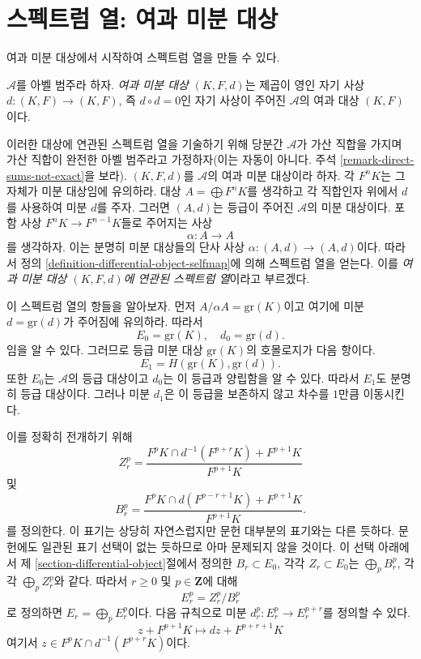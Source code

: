 \section{스펙트럼 열: 여과 미분 대상}
\label{section-filtered-differential}

\noindent
여과 미분 대상에서 시작하여 스펙트럼 열을 만들 수 있다.

\begin{definition}
\label{definition-filtered-differential}
$\mathcal{A}$를 아벨 범주라 하자. {\it 여과 미분 대상}
$(K, F, d)$는 제곱이 영인 자기 사상
$d : (K, F) \to (K, F)$, 즉 $d \circ d = 0$인 자기 사상이 주어진
$\mathcal{A}$의 여과 대상 $(K, F)$이다.
\end{definition}

\noindent
이러한 대상에 연관된 스펙트럼 열을 기술하기 위해 당분간
$\mathcal{A}$가 가산 직합을 가지며 가산 직합이 완전한 아벨 범주라고
가정하자(이는 자동이 아니다. 주석 \ref{remark-direct-sums-not-exact}을
보라). $(K, F, d)$를 $\mathcal{A}$의 여과 미분 대상이라 하자.
각 $F^nK$는 그 자체가 미분 대상임에 유의하라. 대상
$A = \bigoplus F^nK$를 생각하고 각 직합인자 위에서 $d$를 사용하여
미분 $d$를 주자. 그러면 $(A, d)$는 등급이 주어진 $\mathcal{A}$의
미분 대상이다. 포함 사상 $F^nK \to F^{n - 1}K$들로 주어지는 사상
$$
\alpha : A \to A
$$
를 생각하자. 이는 분명히 미분 대상들의 단사 사상
$\alpha : (A, d) \to (A, d)$이다. 따라서 정의
\ref{definition-differential-object-selfmap}에 의해 스펙트럼 열을 얻는다.
이를 {\it 여과 미분 대상 $(K, F, d)$에 연관된 스펙트럼 열}이라고
부르겠다.

\medskip\noindent
이 스펙트럼 열의 항들을 알아보자. 먼저
$A/\alpha A = \text{gr}(K)$이고 여기에 미분
$d = \text{gr}(d)$가 주어짐에 유의하라. 따라서
$$
E_0 = \text{gr}(K), \quad d_0 = \text{gr}(d).
$$
임을 알 수 있다. 그러므로 등급 미분 대상 $\text{gr}(K)$의 호몰로지가
다음 항이다.
$$
E_1 = H(\text{gr}(K), \text{gr}(d)).
$$
또한 $E_0$는 $\mathcal{A}$의 등급 대상이고 $d_0$는 이 등급과
양립함을 알 수 있다. 따라서 $E_1$도 분명히 등급 대상이다. 그러나
미분 $d_1$은 이 등급을 보존하지 않고 차수를 $1$만큼 이동시킨다.

\medskip\noindent
이를 정확히 전개하기 위해
$$
Z_r^p =
\frac{F^pK \cap d^{-1}(F^{p + r}K) + F^{p + 1}K}{F^{p + 1}K}
$$
및
$$
B_r^p =
\frac{F^pK \cap d(F^{p - r + 1}K) + F^{p + 1}K}{F^{p + 1}K}.
$$
를 정의한다. 이 표기는 상당히 자연스럽지만 문헌 대부분의 표기와는
다른 듯하다. 문헌에도 일관된 표기 선택이 없는 듯하므로 아마 문제되지
않을 것이다. 이 선택 아래에서 제 \ref{section-differential-object}절에서
정의한 $B_r \subset E_0$, 각각 $Z_r \subset E_0$는
$\bigoplus_p B_r^p$, 각각 $\bigoplus_p Z_r^p$와 같다. 따라서
$r \geq 0$ 및 $p \in \mathbf{Z}$에 대해
$$
E_r^p = Z_r^p/B_r^p
$$
로 정의하면 $E_r = \bigoplus_p E_r^p$이다. 다음 규칙으로 미분
$d_r^p : E_r^p \to E_r^{p + r}$를 정의할 수 있다.
$$
z + F^{p + 1}K
\longmapsto
dz + F^{p + r + 1}K
$$
여기서 $z \in F^pK \cap d^{-1}(F^{p + r}K)$이다.

